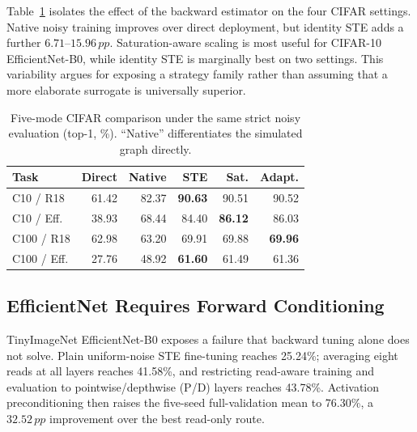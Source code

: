 \documentclass[10pt,twocolumn,letterpaper]{article}
\newcommand{\pp}{\,pp}
\begin{document}
Table~\ref{tab:five_modes} isolates the effect of the backward estimator on the
four CIFAR settings.  Native noisy training improves over direct deployment,
but identity STE adds a further $6.71$--$15.96\pp$.  Saturation-aware scaling is
most useful for CIFAR-10 EfficientNet-B0, while identity STE is marginally best
on two settings.  This variability argues for exposing a strategy family rather
than assuming that a more elaborate surrogate is universally superior.

\begin{table}[t]
\centering
\caption{Five-mode CIFAR comparison under the same strict noisy evaluation
(top-1, \%).  ``Native'' differentiates the simulated graph directly.}
\label{tab:five_modes}
\scriptsize
\setlength{\tabcolsep}{3.1pt}
\begin{tabular}{lrrrrr}
\toprule
Task & Direct & Native & STE & Sat. & Adapt. \\
\midrule
C10 / R18  & 61.42 & 82.37 & \textbf{90.63} & 90.51 & 90.52 \\
C10 / Eff. & 38.93 & 68.44 & 84.40 & \textbf{86.12} & 86.03 \\
C100 / R18 & 62.98 & 63.20 & 69.91 & 69.88 & \textbf{69.96} \\
C100 / Eff.& 27.76 & 48.92 & \textbf{61.60} & 61.49 & 61.36 \\
\bottomrule
\end{tabular}
\end{table}

\subsection{EfficientNet Requires Forward Conditioning}
\label{sec:efficientnet}

TinyImageNet EfficientNet-B0 exposes a failure that backward tuning alone does
not solve.  Plain uniform-noise STE fine-tuning reaches 25.24\%; averaging eight
reads at all layers reaches 41.58\%, and restricting read-aware training and
evaluation to pointwise/depthwise (P/D) layers reaches 43.78\%.  Activation
preconditioning then raises the five-seed full-validation mean to 76.30\%, a
$32.52\pp$ improvement over the best read-only route.
\end{document}
